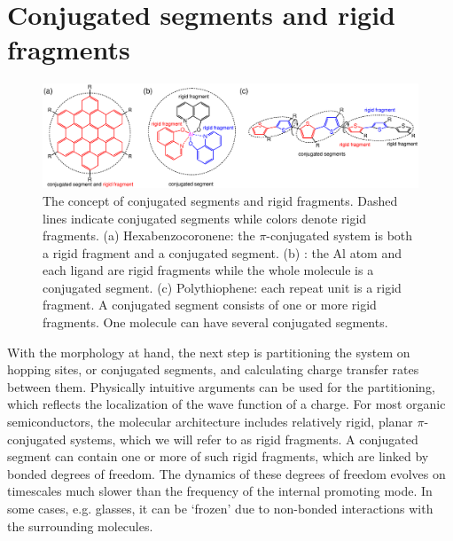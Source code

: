 
\section{Conjugated segments and rigid fragments}
\label{sec:conjugated_segments}

\begin{figure}
\includegraphics[width=\linewidth]{fig/conjugated_segment/fragment_segment}
\caption{The concept of conjugated segments and rigid fragments. Dashed lines indicate conjugated segments while colors denote rigid fragments. (a) Hexabenzocoronene: the $\pi$-conjugated system is both a rigid fragment and a conjugated segment. (b) \Alq: the Al atom and each ligand are rigid fragments while the whole molecule is a conjugated segment. (c) Polythiophene: each repeat unit is a rigid fragment. A conjugated segment consists of one or more rigid fragments. One molecule can have several conjugated segments.}
\label{fig:segment}
\end{figure}

With the morphology at hand, the next step is partitioning the system on hopping sites, or conjugated segments, and calculating charge transfer rates between them. Physically intuitive arguments can be used for the partitioning,  which reflects the localization of the wave function of a charge. For most organic semiconductors, the molecular architecture includes relatively rigid, planar $\pi$-conjugated systems, which we will refer to as rigid fragments. A conjugated segment can contain one or more of such rigid fragments, which are linked by bonded degrees of freedom. The dynamics of these degrees of freedom evolves on timescales much slower than the frequency of the internal promoting mode. In some cases, e.g. glasses, it can be `frozen' due to non-bonded interactions with the surrounding molecules.

